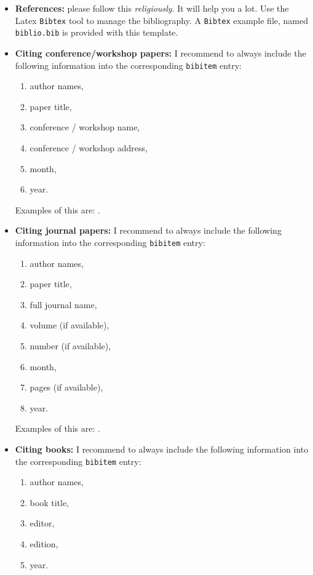 \begin{itemize}
\item \textbf{References:} please follow this {\it religiously}. It will help you a lot. Use the Latex \texttt{Bibtex} tool to manage the bibliography. A \texttt{Bibtex} example file, named \texttt{biblio.bib} is provided with this template.\\

\item \textbf{Citing conference/workshop papers:} I recommend to always include the following information into the corresponding \texttt{bibitem} entry: 
\begin{enumerate}
\item author names, 
\item paper title, 
\item conference / workshop name, 
\item conference / workshop address, 
\item month, 
\item year.
\end{enumerate}
Examples of this are: \cite{Zargham-2011}\cite{Sadler-2006}.\\

\item \textbf{Citing journal papers:} I recommend to always include the following information into the corresponding \texttt{bibitem} entry: 
\begin{enumerate}
 \item author names, 
 \item paper title, 
 \item full journal name, 
 \item volume (if available), 
 \item number (if available), 
 \item month, 
 \item pages (if available), 
 \item year. 
 \end{enumerate}
 Examples of this are: \cite{Shannon-1948}\cite{Boyd-2011}\cite{Zordan-2014}.\\

\item \textbf{Citing books:} I recommend to always include the following information into the corresponding \texttt{bibitem} entry: 
\begin{enumerate}
\item author names, 
\item book title, 
\item editor, 
\item edition, 
\item year.
\end{enumerate}
\end{itemize}
%

